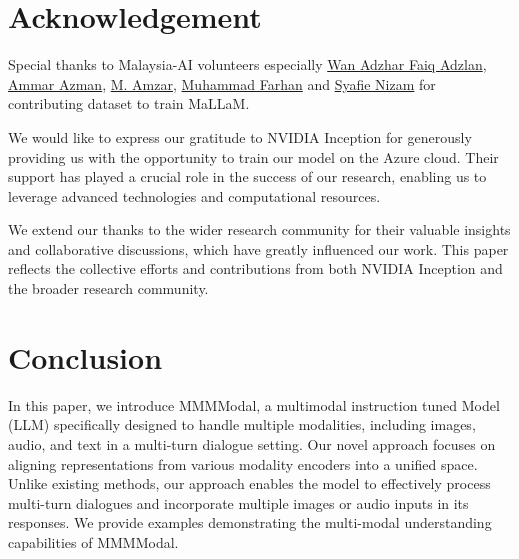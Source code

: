 \documentclass[preprint]{article}
\begin{document}
\section{Acknowledgement}

Special thanks to Malaysia-AI volunteers especially \href{https://www.linkedin.com/in/wan-adzhar-faiq-adzlan-19a27baa/}{Wan Adzhar Faiq Adzlan}, \href{https://www.linkedin.com/in/ammar-azman/}{Ammar Azman}, \href{https://www.linkedin.com/in/amzar96/}{M. Amzar}, \href{https://www.linkedin.com/in/muhammad-farhan-helmy-0529501a7/}{Muhammad Farhan} and \href{https://www.linkedin.com/in/syafie-nizam/}{Syafie Nizam} for contributing dataset to train MaLLaM.

We would like to express our gratitude to NVIDIA Inception for generously providing us with the opportunity to train our model on the Azure cloud. Their support has played a crucial role in the success of our research, enabling us to leverage advanced technologies and computational resources.

We extend our thanks to the wider research community for their valuable insights and collaborative discussions, which have greatly influenced our work. This paper reflects the collective efforts and contributions from both NVIDIA Inception and the broader research community.

\section{Conclusion}

In this paper, we introduce MMMModal, a multimodal instruction tuned Model (LLM) specifically designed to handle multiple modalities, including images, audio, and text in a multi-turn dialogue setting. Our novel approach focuses on aligning representations from various modality encoders into a unified space. Unlike existing methods, our approach enables the model to effectively process multi-turn dialogues and incorporate multiple images or audio inputs in its responses. We provide examples demonstrating the multi-modal understanding capabilities of MMMModal.

{}

\end{document}
